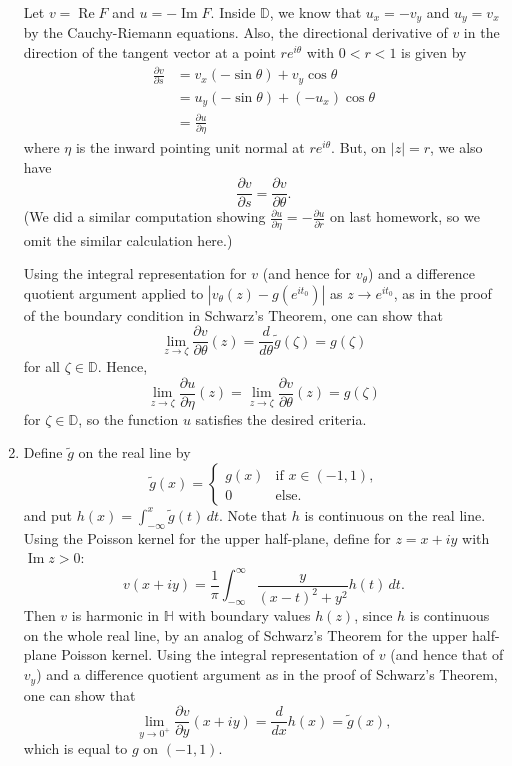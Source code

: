 \documentclass[11pt]{book}
\theoremstyle{definition}
\renewcommand{\Re}{\operatorname{Re}}
\renewcommand{\Im}{\operatorname{Im}}
\begin{document}
\begin{enumerate}
            Let $v = \Re F$ and $u = - \Im F$.   Inside $\mathbb D$, we know that $u_x = -v_y$ and $u_y  = v_x$ by the Cauchy-Riemann equations.  Also,  the directional derivative of $v$ in the direction of the tangent vector at a point $re^{i\theta}$ with $0 < r < 1$ is given by
            \begin{align*}
                \frac{\partial v}{\partial s} &= v_x( -\sin \theta) + v_y \cos \theta \\
                &= u_y (-\sin \theta) + (-u_x) \cos \theta\\
                &= \frac{\partial u}{\partial \eta} 
            \end{align*}
            where $\eta$ is the inward pointing unit normal at $re^{i\theta}$.  But, on $|z| = r$,  we also have
            \[ \frac{\partial v}{\partial s} = \frac{\partial v}{\partial \theta}. \](We did a similar computation showing $\frac{\partial u}{\partial \eta} = -\frac{\partial u}{\partial r}$ on last homework, so we omit the similar calculation here.)  
            
            Using the integral representation for $v$ (and hence for $v_\theta$) and a difference quotient argument applied to $|v_\theta(z) - g(e^{it_0})|$ as $z\to e^{it_0}$, as in the proof of the boundary condition in Schwarz's Theorem, one can show that
            \[ \lim_{z \to \zeta} \frac{\partial v}{\partial \theta} (z) = \frac{d}{d\theta} \widetilde g(\zeta) = g(\zeta) \] for all $\zeta \in \mathbb D$. Hence,
            \[ \lim_{z \to \zeta} \frac{\partial u}{\partial \eta}(z) = \lim_{z \to \zeta}\frac{\partial v}{\partial \theta}(z) =   g(\zeta ) \] for $\zeta\in \mathbb D$, so the function $u$ satisfies the desired criteria. 


  \item  Define $\widetilde g$ on the real line by 
    \[ \widetilde g(x) = \begin{cases} 
        g(x) & \text{if $x\in (-1,1)$,}\\
        0 & \text{else.}
      \end{cases} \] and put $h(x) = \int_{-\infty}^x \widetilde g(t) \, dt$.  Note that $h$ is continuous on the real line. Using the Poisson kernel for the upper half-plane, define for $z=x+iy$ with $\Im z> 0$:
      \[ v(x+iy) = \frac{1}{\pi} \int_{-\infty}^{\infty} \frac{y}{(x-t)^2 + y^2} h(t) \, dt .\] 
      Then $v$ is harmonic in $\mathbb H$ with boundary values $h(z)$, since $h$ is continuous on the whole real line, by an analog of Schwarz's Theorem for the upper half-plane Poisson kernel.  Using the integral representation of $v$ (and hence that of $v_y$) and a difference quotient argument as in the proof of Schwarz's Theorem, one can show that 
      \[ \lim_{y\rightarrow 0^+} \frac{\partial v}{\partial y} (x+iy) = \frac{d}{dx} h(x) = \widetilde g(x), \] which is equal to $g$ on $(-1,1)$. 


\end{enumerate}
\end{document}
